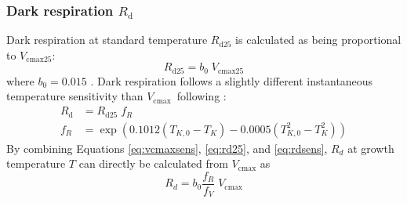 \documentclass{myreport}
\newcommand{\vcmax}{$V_{\text{cmax}}$}
\begin{document}
\subsubsection{Dark respiration $R_{\mathrm{d}}$}
\label{sec:rd}
Dark respiration at standard temperature $R_{\mathrm{d25}}$ is calculated as being proportional to $V_{\mathrm{cmax25}}$:
\begin{equation}
\label{eq:rd25}
    R_{\mathrm{d25}} = b_0 \; V_{\mathrm{cmax25}}
\end{equation}
where $b_0 = 0.015$ \citep{atkin15}. Dark respiration follows a slightly different instantaneous temperature sensitivity than \vcmax\ following \cite{heskel16}:
\begin{align}
\label{eq:rdsens}
    R_{\mathrm{d}} &=  R_{\mathrm{d25}}\; f_R  \\
    f_R &= \exp \left(  0.1012(T_{K,0}-T_K) - 0.0005(T_{K,0}^2-T_K^2) \right) 
\end{align}
By combining Equations \ref{eq:vcmaxsens}, \ref{eq:rd25}, and \ref{eq:rdsens}, $R_d$ at growth temperature $T$ can directly be calculated from $V_{\mathrm{cmax}}$ as
\begin{equation}
    R_d = b_0 \frac{f_R}{f_V}\;V_{\mathrm{cmax}}
\end{equation}
\end{document}
